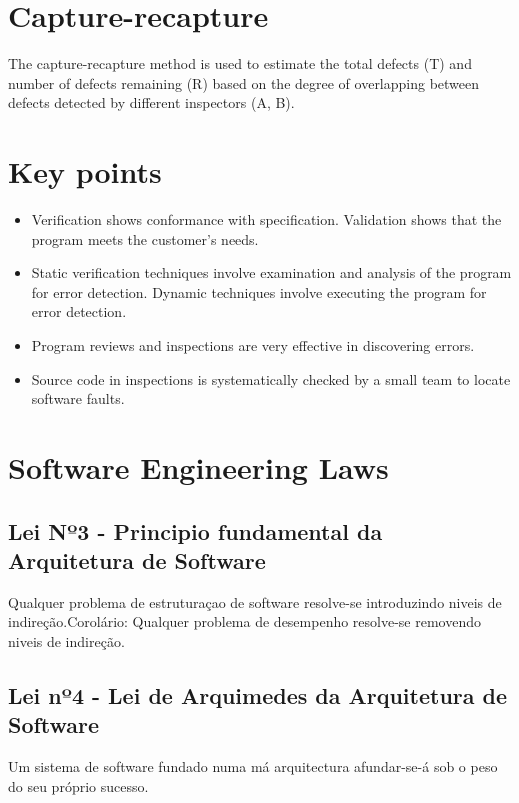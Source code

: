 \documentclass[../ESOF_notes.tex]{subfiles}
\begin{document}
\section{Capture-recapture}
    The capture-recapture method is used to estimate the total defects (T) and number of defects remaining (R) based on the degree of overlapping between defects detected by different inspectors (A, B).

\section{Key points}
    \begin{itemize}
        \item Verification shows conformance with specification. Validation shows that the program meets the customer’s needs.
        \item Static verification techniques involve examination and analysis of the program for error detection. Dynamic techniques involve executing the program for error detection.
        \item Program reviews and inspections are very effective in discovering errors. 
        \item Source code in inspections is systematically checked by a small team to locate software faults.
    \end{itemize}

\section{Software Engineering Laws}

    \subsection{Lei Nº3 - Principio fundamental da Arquitetura de Software}
    Qualquer problema de estruturaçao de software resolve-se introduzindo niveis de indireção.\newline Corolário: Qualquer problema de desempenho resolve-se removendo niveis de indireção.
    
    \subsection{Lei nº4 - Lei de Arquimedes da Arquitetura de Software}
    Um sistema de software fundado numa má arquitectura afundar-se-á sob o peso do seu próprio sucesso.
    
\end{document}
